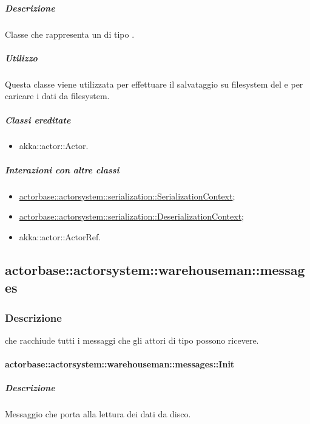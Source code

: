 \documentclass{scalatekids-article}
\begin{document}
\subparagraph{Descrizione}

Classe che rappresenta un  di tipo .

\subparagraph{Utilizzo}

Questa classe viene utilizzata per effettuare il salvataggio su filesystem del
 e per caricare i dati da filesystem.

\subparagraph{Classi ereditate}

\begin{itemize}

\item akka::actor::Actor.

\end{itemize}

\subparagraph{Interazioni con altre classi}

\begin{itemize}
\item \hyperref[sec:actorbase::actorsystem::serialization::SerializationContext]{actorbase::actorsystem::serialization::SerializationContext};
\item \hyperref[sec:actorbase::actorsystem::serialization::DeserializationContext]{actorbase::actorsystem::serialization::DeserializationContext};
\item akka::actor::ActorRef.
\end{itemize}

\subsection{actorbase::actorsystem::warehouseman::messages}
\label{sec:actorbase::actorsystem::warehouseman::messages}

\subsubsection{Descrizione}

 che racchiude tutti i messaggi che gli attori di tipo
 possono ricevere.

\paragraph{actorbase::actorsystem::warehouseman::messages::Init}
\label{sec:actorbase::actorsystem::warehouseman::messages::Init}

\subparagraph{Descrizione}

Messaggio che porta alla lettura dei dati da disco.
\end{document}
